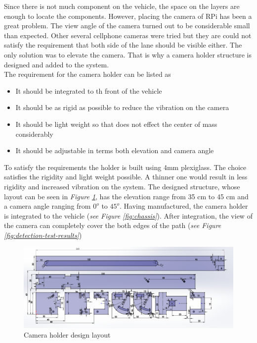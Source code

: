 \documentclass[a4paper,12pt]{article}
\begin{document}
	Since there is not much component on the vehicle, the space on the layers are enough to locate the components. However, placing the camera of RPi has been a great problem. The view angle of the camera turned out to be considerable small than expected. Other several cellphone cameras were tried but they are could not satisfy the requirement that both side of the lane should be visible either. The only solution was to elevate the camera. That is why a camera holder structure is designed and added to the system.\\
	
	The requirement for the camera holder can be listed as
	 \begin{itemize}
	 	\item It should be integrated to th front of the vehicle
	 	\item It should be as rigid as possible to reduce the vibration on the camera
	 	\item It should be light weight so that does not effect the center of mass considerably
	 	\item It should be adjustable in terms both elevation and camera angle
	 \end{itemize} 
	 
	 To satisfy the requirements the holder is built using 4mm plexiglass. The choice satisfies the rigidity and light weight possible. A thinner one would result in less rigidity and increased vibration on the system. The designed structure, whose layout can be seen in \textit{Figure \ref{fig:camera-holder}}, has the elevation range from 35 cm to 45 cm and a camera angle ranging from $0^o$ to $45^o$. Having manufactured, the camera holder is integrated to the vehicle (\textit{see Figure \ref{fig:chassis}}). After integration, the view of the camera can completely cover the both edges of the path (\textit{see Figure \ref{fig:detection-test-results}})
	 
\begin{figure}[h]
		 \includegraphics[width=\textwidth,center]{images/holder.PNG}
		 \caption{Camera holder design layout}\label{fig:camera-holder}
\end{figure}
\end{document}
